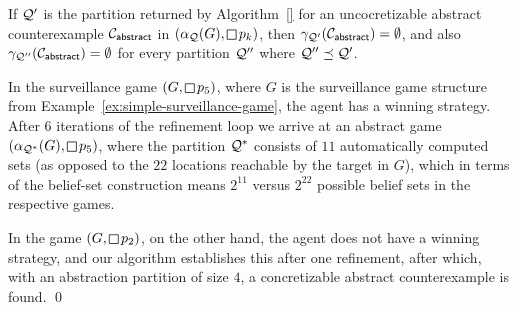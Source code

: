 \begin{theorem}If $\mathcal{Q}'$ is the partition returned by Algorithm~\ref{} for an uncocretizable abstract counterexample $\mathcal{C}_{\mathsf{abstract}}$ in $(\alpha_\part(G),\LTLglobally p_k)$, then $\gamma_{\mathcal{Q}'}(\mathcal{C}_{\mathsf{abstract}}) = \emptyset$, and also $\gamma_{\mathcal{Q}''}(\mathcal{C}_{\mathsf{abstract}}) = \emptyset$ for every partition $\mathcal{Q}''$ where $\mathcal{Q}'' \preceq \mathcal{Q}'$.
\end{theorem}

\begin{example}\label{ex:simple-safety-realizability}
In the surveillance game $(G,\LTLglobally p_5)$, where $G$ is the surveillance game structure from Example~\ref{ex:simple-surveillance-game}, the agent has a winning strategy. After $6$ iterations of the refinement loop we arrive at an abstract game $(\alpha_{\part^*}(G),\LTLglobally p_5)$, where the partition $\mathcal{Q}^*$ consists of $11$ automatically computed sets (as opposed to the $22$ locations reachable by the target in $G$), which in terms of the belief-set construction means $2^{11}$ versus $2^{22}$ possible belief sets in the respective games.

In the game $(G,\LTLglobally p_2)$, on the other hand, the agent does not have a winning strategy, and our algorithm establishes this after one refinement, after which, with an abstraction partition of size $4$, a concretizable abstract counterexample is found.
\qed
\end{example}